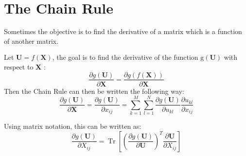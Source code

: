 \section{The Chain Rule}

Sometimes the objective is to find the derivative of a matrix which is a function of another matrix. 

\begin{theorem}
    Let $ \mathbf{U}=f(\mathbf{X}) $, the goal is to find the derivative of the function $ \mathrm{g}(\mathbf{U}) $ with respect to $ \mathbf{X} $ :
\begin{equation}
\frac{\partial g(\mathbf{U})}{\partial \mathbf{X}}=\frac{\partial g(f(\mathbf{X}))}{\partial \mathbf{X}}
\end{equation}
Then the Chain Rule can then be written the following way:
\begin{equation}
\frac{\partial g(\mathbf{U})}{\partial \mathbf{X}}=\frac{\partial g(\mathbf{U})}{\partial x_{i j}}=\sum_{k=1}^{M} \sum_{l=1}^{N} \frac{\partial g(\mathbf{U})}{\partial u_{k l}} \frac{\partial u_{k l}}{\partial x_{i j}}
\end{equation}
\end{theorem}

\begin{corollary}
    Using matrix notation, this can be written as:
\begin{equation}
\frac{\partial g(\mathbf{U})}{\partial X_{i j}}=\operatorname{Tr}\left[\left(\frac{\partial g(\mathbf{U})}{\partial \mathbf{U}}\right)^{T} \frac{\partial \mathbf{U}}{\partial X_{i j}}\right]
\end{equation}
\end{corollary}


